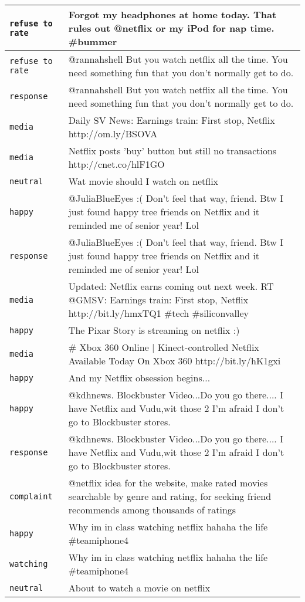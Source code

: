 {\begin{longtable}{|l|p{160mm}|}
      \tabularnewline\hline
         \texttt{refuse to rate} & Forgot my headphones at home today. That rules out @netflix or my iPod for nap time. \#bummer
      \tabularnewline\hline
         \texttt{refuse to rate} & @rannahshell But you watch netflix all the time. You need something fun that you don't normally get to do.
      \tabularnewline\hline
         \texttt{response} & @rannahshell But you watch netflix all the time. You need something fun that you don't normally get to do.
      \tabularnewline\hline
         \texttt{media} & Daily SV News: Earnings train: First stop, Netflix http://om.ly/BSOVA
      \tabularnewline\hline
         \texttt{media} & Netflix posts 'buy' button but still no transactions http://cnet.co/hlF1GO
      \tabularnewline\hline
         \texttt{neutral} & Wat movie should I watch on netflix
      \tabularnewline\hline
         \texttt{happy} & @JuliaBlueEyes :( Don't feel that way, friend. Btw I just found happy tree friends on Netflix and it reminded me of senior year! Lol
      \tabularnewline\hline
         \texttt{response} & @JuliaBlueEyes :( Don't feel that way, friend. Btw I just found happy tree friends on Netflix and it reminded me of senior year! Lol
      \tabularnewline\hline
         \texttt{media} & Updated: Netflix earns coming out next week. RT @GMSV: Earnings train: First stop, Netflix http://bit.ly/hmxTQ1 \#tech \#siliconvalley
      \tabularnewline\hline
         \texttt{happy} & The Pixar Story is streaming on netflix :)
      \tabularnewline\hline
         \texttt{media} & \# Xbox 360 Online | Kinect-controlled Netflix Available Today On Xbox 360 http://bit.ly/hK1gxi
      \tabularnewline\hline
         \texttt{happy} & And my Netflix obsession begins...
      \tabularnewline\hline
         \texttt{happy} & @kdhnews. Blockbuster Video...Do you go there.... I have Netflix and Vudu,wit those 2 I'm afraid I don't go to Blockbuster stores.
      \tabularnewline\hline
         \texttt{response} & @kdhnews. Blockbuster Video...Do you go there.... I have Netflix and Vudu,wit those 2 I'm afraid I don't go to Blockbuster stores.
      \tabularnewline\hline
         \texttt{complaint} & @netflix idea for the website, make rated movies searchable by genre and rating, for seeking friend recommends among thousands of ratings
      \tabularnewline\hline
         \texttt{happy} & Why im in class watching netflix hahaha the life \#teamiphone4
      \tabularnewline\hline
         \texttt{watching} & Why im in class watching netflix hahaha the life \#teamiphone4
      \tabularnewline\hline
         \texttt{neutral} & About to watch a movie on netflix

\end{longtable}}
